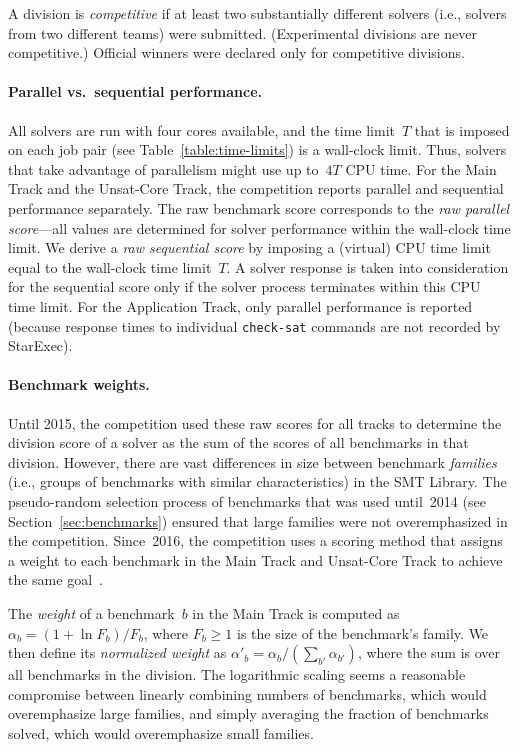 \documentclass[dvipsnames,table,twoside,11pt]{article}
\newcommand{\maintrack}{Main Track\xspace}
\newcommand{\apptrack}{Application Track\xspace}
\newcommand{\ucoretrack}{Unsat-Core Track\xspace}
\begin{document}
A division is \emph{competitive} if at least two substantially
different solvers (i.e., solvers from two different teams) were
submitted.  (Experimental divisions are never competitive.)  Official
winners were declared only for competitive divisions.

\paragraph{Parallel vs.\ sequential performance.}

All solvers are run with four cores available, and the time limit~$T$
that is imposed on each job pair (see Table~\ref{table:time-limits})
is a wall-clock limit.  Thus, solvers that take advantage of
parallelism might use up to~$4T$ CPU time.  For the \maintrack and the
\ucoretrack, the competition reports parallel and sequential
performance separately.  The raw benchmark score corresponds to the
\emph{raw parallel score}---all values are determined for solver
performance within the wall-clock time limit.  We derive a \emph{raw
  sequential score} by imposing a (virtual) CPU time limit equal to
the wall-clock time limit~$T$.  A solver response is taken into
consideration for the sequential score only if the solver process
terminates within this CPU time limit.  For the \apptrack, only
parallel performance is reported (because response times to individual
{\tt check-sat} commands are not recorded by StarExec).

\paragraph{Benchmark weights.}

Until 2015, the competition used these raw scores for all tracks to
determine the division score of a solver as the sum of the scores of
all benchmarks in that division.  However, there are vast differences
in size between benchmark \emph{families} (i.e., groups of benchmarks
with similar characteristics) in the SMT Library.  The pseudo-random
selection process of benchmarks that was used until~2014 (see
Section~\ref{sec:benchmarks}) ensured that large families were not
overemphasized in the competition.  Since~2016, the competition uses a
scoring method that assigns a weight to each benchmark in the
\maintrack and \ucoretrack to achieve the same
goal~\cite{rules16,rules17,rules18}.

The \emph{weight} of a benchmark~$b$ in the \maintrack is computed as
$\alpha_b = (1 + \ln F_b)/F_b$, where $F_b \geq 1$ is the size of the
benchmark's family.  We then define its \emph{normalized weight} as
$\alpha'_b = \alpha_b / (\sum_{b'} \alpha_{b'})$, where the sum is
over all benchmarks in the division.  The logarithmic scaling seems a
reasonable compromise between linearly combining numbers of
benchmarks, which would overemphasize large families, and simply
averaging the fraction of benchmarks solved, which would overemphasize
small families.
\end{document}
